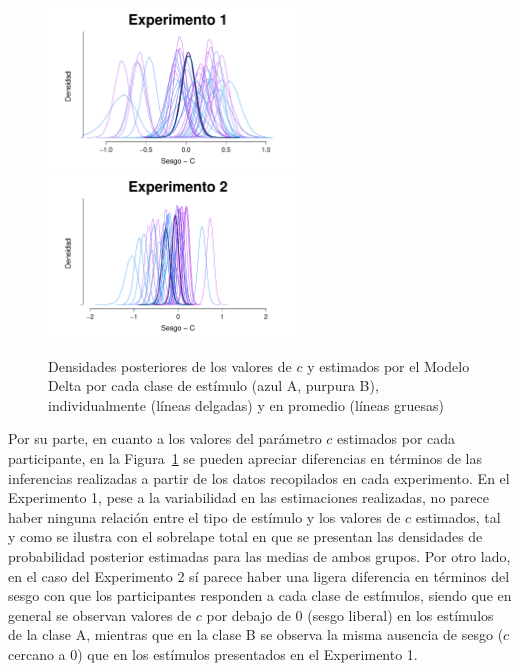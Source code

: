 \begin{figure}[th]
\centering
\includegraphics[width=0.6\textwidth]{Figures/MDelta_Cbias_E1}\\
\includegraphics[width=0.6\textwidth]{Figures/MDelta_Cbias_E2}\\
\caption[Modelo Delta: Densidades posteriores de los valores de $c$ estimados individualmente y en promedio, por experimento]{Densidades posteriores de los valores de $c$ y estimados por el Modelo Delta por cada clase de estímulo (azul A, purpura B), individualmente (líneas delgadas) y en promedio (líneas gruesas)}
\label{fig:Delta_Cbias}
\end{figure}

Por su parte, en cuanto a los valores del parámetro $c$ estimados por cada participante, en la Figura~\ref{fig:Delta_Cbias} se pueden apreciar diferencias en términos de las inferencias realizadas a partir de los datos recopilados en cada experimento. En el Experimento 1, pese a la variabilidad en las estimaciones realizadas, no parece haber ninguna relación entre el tipo de estímulo y los valores de $c$ estimados, tal y como se ilustra con el sobrelape total en que se presentan las densidades de probabilidad posterior estimadas para las medias de ambos grupos. Por otro lado, en el caso del Experimento 2 sí parece haber una ligera diferencia en términos del sesgo con que los participantes responden a cada clase de estímulos, siendo que en general se observan valores de $c$ por debajo de 0 (sesgo liberal) en los estímulos de la clase A, mientras que en la clase B se observa la misma ausencia de sesgo ($c$ cercano a $0$) que en los estímulos presentados en el Experimento 1.\\

